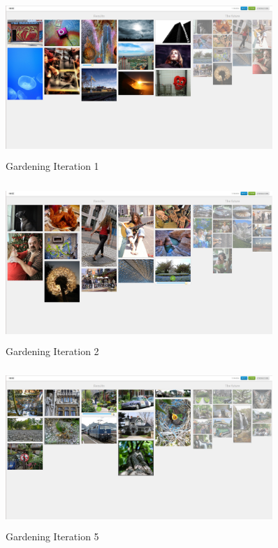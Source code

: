 \documentclass[english]{tktltiki}
\begin{document}
\begin{figure}[!h]
  \centering
    \includegraphics[width=0.90\textwidth,height=6cm]{figures/gardening_1.jpg}
    \caption{Gardening Iteration 1}
    \label{gardening_1}
\end{figure}

\begin{figure}[!h]
  \centering
    \includegraphics[width=0.90\textwidth,height=6cm]{figures/gardening_2.jpg}
    \caption{Gardening Iteration 2}
    \label{gardening_2}
\end{figure}

\begin{figure}[!h]
  \centering
    \includegraphics[width=0.90\textwidth,height=6cm]{figures/gardening_5.jpg}
    \caption{Gardening Iteration 5}
    \label{gardening_5}
\end{figure}
\end{document}
